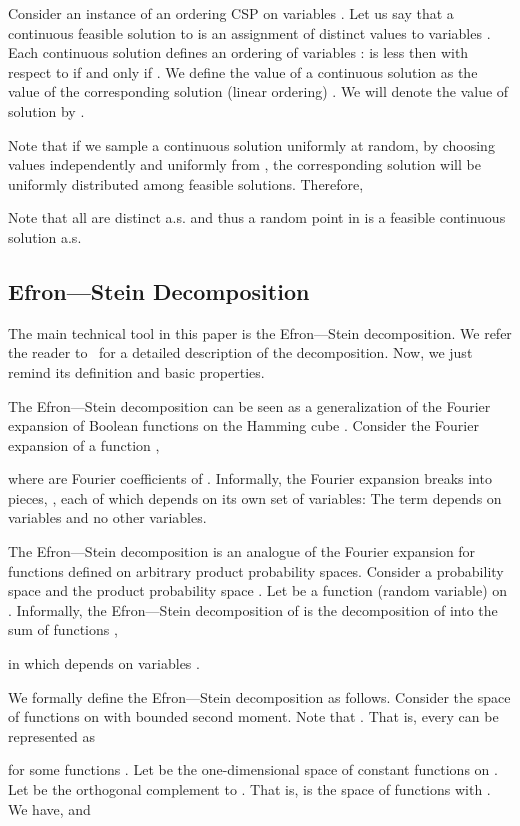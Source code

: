 \documentclass[11pt]{article}
\begin{document}
Consider an instance  of an ordering CSP on variables .
Let us say that a continuous feasible solution to  is an assignment of distinct values  to variables . Each continuous solution  defines
an ordering  of variables :  is less then  with respect to  if and only if .
We define the value of a continuous solution 
as the value of the corresponding solution (linear ordering) . We will denote the value of
solution  by
.

Note that if we sample a continuous solution
 uniformly at random, by  choosing values  independently and uniformly from , the corresponding solution 
will be uniformly distributed among  feasible solutions. Therefore,

Note that all  are distinct a.s. and thus a random point in  is a feasible
continuous solution a.s. 

\subsection{Efron---Stein Decomposition}\label{sec:EfronStein}
The main technical tool in this paper is the Efron---Stein decomposition. We refer the reader to~\cite[Section 8.3]{ODonnell} for
a detailed description of the decomposition. Now, we just remind its definition and basic properties.

The Efron---Stein decomposition can be seen as a generalization of the Fourier expansion
of Boolean functions on the Hamming cube . Consider the Fourier expansion of a function
,

where  are Fourier coefficients of . Informally,
the Fourier expansion  breaks  into pieces, , each of which depends on its own set of variables: The term
 depends on variables  and no other variables.

The Efron---Stein decomposition is an analogue of the Fourier expansion for functions defined on arbitrary product probability spaces. Consider a probability space  and the product probability space .
Let  be a function (random variable) on . Informally, the Efron---Stein decomposition of  is the decomposition of  into the sum of
functions ,

in which  depends on variables .

We formally define the  Efron---Stein decomposition  as follows.
Consider the space  of functions on  with bounded second moment. Note that .
That is, every  can be represented as

for some functions . Let  be the one-dimensional space of constant functions on . Let  be the orthogonal complement to . That is,  is the space of functions
 with . We have,  and
\end{document}
